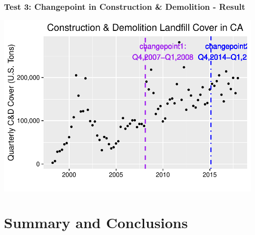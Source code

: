 \documentclass[12pt,]{article}
\begin{document}
\subsubsection{Test 3: Changepoint in Construction \& Demolition -
Result}\label{test-3-changepoint-in-construction-demolition---result}

\includegraphics{SKo_Project_Template_files/figure-latex/Test3_2-1.pdf}

\newpage

\section{Summary and Conclusions}\label{summary-and-conclusions}
\end{document}
